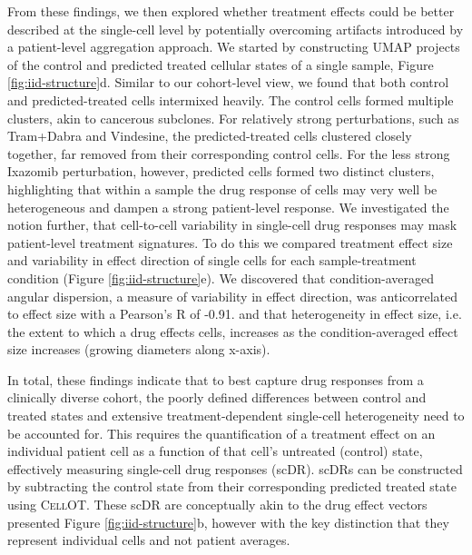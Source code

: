From these findings, we then explored whether treatment effects could be better described at the single-cell level by potentially overcoming artifacts introduced by a patient-level aggregation approach.
We started by constructing UMAP projects of the control and predicted treated cellular states of a single sample, Figure \ref{fig:iid-structure}d.
Similar to our cohort-level view, we found that both control and predicted-treated cells intermixed heavily.
The control cells formed multiple clusters, akin to cancerous subclones.
For relatively strong perturbations, such as Tram+Dabra and Vindesine, the predicted-treated cells clustered closely together, far removed from their corresponding control cells.
For the less strong Ixazomib perturbation, however, predicted cells formed two distinct clusters, highlighting that within a sample the drug response of cells may very well be heterogeneous and dampen a strong patient-level response.
We investigated the notion further, that cell-to-cell variability in single-cell drug responses may mask patient-level treatment signatures.
To do this we compared treatment effect size and variability in effect direction of single cells for each sample-treatment condition (Figure \ref{fig:iid-structure}e).
We discovered that condition-averaged angular dispersion, a measure of variability in effect direction, was anticorrelated to effect size with a Pearson’s R of -0.91.
and that heterogeneity in effect size, i.e. the extent to which a drug effects cells, increases as the condition-averaged effect size increases (growing diameters along x-axis). 

In total, these findings indicate that to best capture drug responses from a clinically diverse cohort, the poorly defined differences between control and treated states and extensive treatment-dependent single-cell heterogeneity need to be accounted for.
 This requires the quantification of a treatment effect on an individual patient cell as a function of that cell’s untreated (control) state, effectively measuring single-cell drug responses (scDR).
 scDRs can be constructed by subtracting the control state from their corresponding predicted treated state using \textsc{CellOT}.
These scDR are conceptually akin to the drug effect vectors presented Figure \ref{fig:iid-structure}b, however with the key distinction that they represent individual cells and not patient averages.

